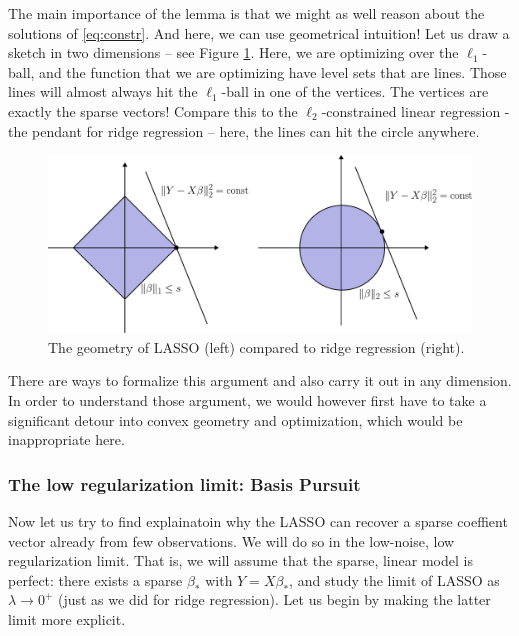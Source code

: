 \documentclass{article}
\begin{document}
\smallskip 
The main importance of the  lemma is that we might as well reason about the solutions of \eqref{eq:constr}. And here, we can use geometrical intuition! Let us draw a sketch in two dimensions -- see Figure \ref{fig:l1l2}. Here, we are optimizing over the $\ell_1$-ball, and the function that we are optimizing have level sets that are lines. Those lines will almost always hit the $\ell_1$-ball in one of the vertices. The vertices are exactly the sparse vectors! Compare this to the $\ell_2$-constrained linear regression - the pendant for ridge regression -- here, the lines can hit the circle anywhere.

\begin{figure}
    \centering
    \includegraphics[width=0.75\linewidth]{graphics/l1_vs_l2.pdf}
    \caption{The geometry of LASSO (left) compared to ridge regression (right).}
    \label{fig:l1l2}
\end{figure}

There are ways to formalize this argument and also carry it out in any dimension. In order to understand those argument, we would however first have to take a significant detour into convex geometry and optimization, which would be inappropriate here.

\subsubsection{The low regularization limit: Basis Pursuit} Now let us try to find explainatoin why the LASSO can recover a sparse coeffient vector already from few observations. We will do so in the low-noise, low regularization limit. That is, we will assume that the sparse, linear model is perfect: there exists a sparse $\beta_*$ with $Y= X\beta_*$, and study the limit of LASSO as $\lambda \to 0^+$ (just as we did for ridge regression). Let us begin by making the latter limit more explicit.
\end{document}
